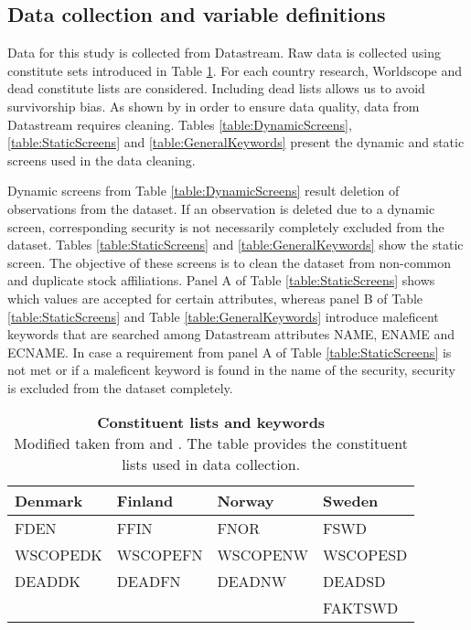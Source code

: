 \documentclass[12pt]{article}
\begin{document}
\begin{appendices}
\section{Data collection and variable definitions}
\renewcommand{\thefigure}{A.\arabic{figure}}
\setcounter{figure}{0}
\renewcommand{\thetable}{A.\arabic{table}}
\setcounter{table}{0}

Data for this study is collected from Datastream. Raw data is collected using constitute sets introduced in Table \ref{table:constituteLists}. For each country research, Worldscope and dead constitute lists are considered. Including dead lists allows us to avoid survivorship bias. As shown by \citet{Ince2006} in order to ensure data quality, data from Datastream requires cleaning. Tables \ref{table:DynamicScreens}, \ref{table:StaticScreens} and \ref{table:GeneralKeywords} present the dynamic and static screens used in the data cleaning. \par

Dynamic screens from Table \ref{table:DynamicScreens} result deletion of observations from the dataset. If an observation is deleted due to a dynamic screen, corresponding security is not necessarily completely excluded from the dataset. Tables \ref{table:StaticScreens} and \ref{table:GeneralKeywords} show the static screen. The objective of these screens is to clean the dataset from non-common and duplicate stock affiliations. Panel A of Table \ref{table:StaticScreens} shows which values are accepted for certain attributes, whereas panel B of Table \ref{table:StaticScreens} and Table \ref{table:GeneralKeywords} introduce maleficent keywords that are searched among Datastream attributes NAME, ENAME and ECNAME. In case a requirement from panel A of Table \ref{table:StaticScreens} is not met or if a maleficent keyword is found in the name of the security, security is excluded from the dataset completely. \par

\begin{table}[H] 
\footnotesize
\caption[Constituent lists and keywords]{\textbf{Constituent lists and keywords}\\ Modified taken from \protect\citet{Ince2006} and \protect\citet{HANAUER2023106712}. The table provides the constituent lists used in data collection.}
 \label{table:constituteLists}
\centering
\begin{tabularx}{\textwidth}{X X X X}
\toprule
Denmark & Finland & Norway & Sweden \\
\midrule
FDEN 		&  FFIN		& FNOR		& FSWD\\
WSCOPEDK & WSCOPEFN & WSCOPENW& WSCOPESD\\
DEADDK 	&   DEADFN 	& DEADNW 	& DEADSD\\
& & & FAKTSWD\\
 \bottomrule
 \end{tabularx}
 \end{table} 
 

\end{appendices}
\end{document}
